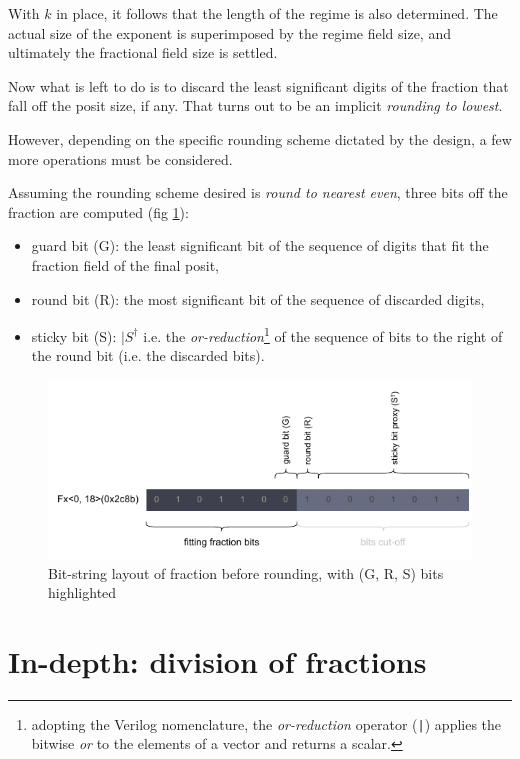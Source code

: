 With $k$ in place, it follows that the length of the regime is also determined. The actual size of the exponent is superimposed by the regime field size, and ultimately the fractional field size is settled.

Now what is left to do is to discard the least significant digits of the fraction that fall off the posit size, if any. That turns out to be an implicit \textit{rounding to lowest}.

However, depending on the specific rounding scheme dictated by the design, a few more operations must be considered.



Assuming the rounding scheme desired is \textit{round to nearest even}, three bits off the fraction are computed (fig \ref{fig:fraction_before_rounding}):
\begin{itemize}
\item guard bit (G): the least significant bit of the sequence of digits that fit the fraction field of the final posit,
\item round bit (R): the most significant bit of the sequence of discarded digits,
\item sticky bit (S): $|S^{\dagger}$ i.e. the \textit{or-reduction}\footnote{adopting the Verilog nomenclature, the \textit{or-reduction} operator (\texttt{|}) applies the bitwise \textit{or} to the elements of a vector and returns a scalar.
} of the sequence of bits to the right of the round bit (i.e. the discarded bits).
\end{itemize}

\begin{figure}
    \begin{center}
    \includegraphics[width=\textwidth]{figures/bits-fraction.drawio.pdf}
    \caption{Bit-string layout of fraction before rounding, with (G, R, S) bits highlighted}
    \label{fig:fraction_before_rounding}
    \end{center}
\end{figure}


\section{In-depth: division of fractions}\label{Approximated_Algorithms}
